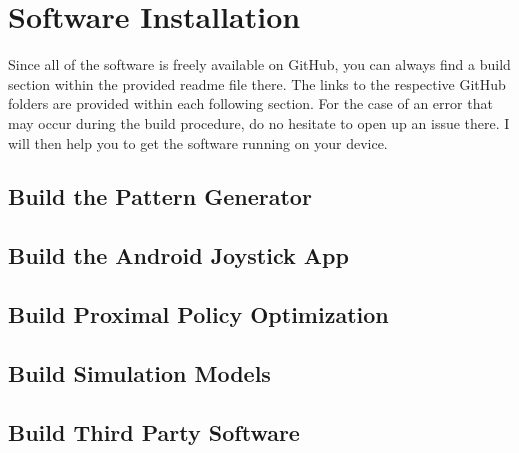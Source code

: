 \chapter{Software Installation}
\label{sec::A_si}
Since all of the software is freely available on GitHub, you can always find a build section within the provided readme file there. The links to the respective GitHub folders are provided within each following section. For the case of an error that may occur during the build procedure, do no hesitate to open up an issue there. I will then help you to get the software running on your device.
\section{Build the Pattern Generator}
\label{sec::A1_pg}
\section{Build the Android Joystick App}
\label{sec::A2_aa}
\section{Build Proximal Policy Optimization}
\section{Build Simulation Models}
\label{sec::A4_sm}
\section{Build Third Party Software}
\label{sec::A5_tp}
